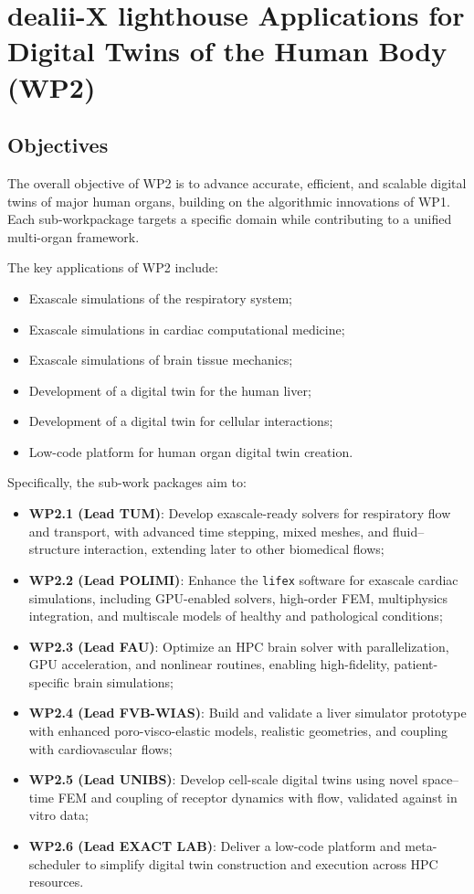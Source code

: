 \documentclass[a4paper,12pt, numbers]{article}
\begin{document}
\section{{dealii-X lighthouse Applications for Digital Twins of the Human Body (WP2)}}
\label{sec:wp2_applications}


\subsection{Objectives}

The overall objective of WP2 is to advance accurate, efficient, and scalable digital twins of major human organs, building on the algorithmic innovations of WP1. Each sub-workpackage targets a specific domain while contributing to a unified multi-organ framework.

The key applications of WP2 include:
\begin{itemize}
\item Exascale simulations of the respiratory system;
\item Exascale simulations in cardiac computational medicine;
\item Exascale simulations of brain tissue mechanics;
\item Development of a digital twin for the human liver;
\item Development of a digital twin for cellular interactions;
\item Low-code platform for human organ digital twin creation.
\end{itemize}

Specifically, the sub-work packages aim to:
\begin{itemize}
\item \textbf{WP2.1 (Lead TUM)}: Develop exascale-ready solvers for respiratory flow and transport, with advanced time
stepping, mixed meshes, and fluid–structure interaction, extending later to other biomedical flows;
\item \textbf{WP2.2 (Lead POLIMI)}: Enhance the \texttt{lifex} software for exascale cardiac simulations, including GPU-enabled solvers, high-order FEM, multiphysics integration, and multiscale models of healthy and pathological conditions;
\item \textbf{WP2.3 (Lead FAU)}: Optimize an HPC brain solver with parallelization, GPU acceleration, and nonlinear routines, enabling high-fidelity, patient-specific brain simulations;
\item \textbf{WP2.4 (Lead FVB-WIAS)}: Build and validate a liver simulator prototype with enhanced poro-visco-elastic models, realistic geometries, and coupling with cardiovascular flows;
\item \textbf{WP2.5 (Lead UNIBS)}: Develop cell-scale digital twins using novel space–time FEM and coupling of receptor dynamics with flow, validated against in vitro data;
\item \textbf{WP2.6 (Lead EXACT LAB)}: Deliver a low-code platform and meta-scheduler to simplify digital twin construction and execution across HPC resources.
\end{itemize}
\end{document}
